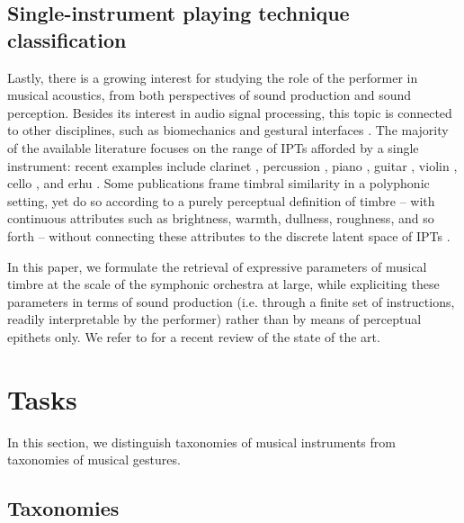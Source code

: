 \documentclass{article}
\makeatletter
\newcommand*{\ie}{i.e.\@\xspace}
\makeatother
\begin{document}
\subsection{Single-instrument playing technique classification}
Lastly, there is a growing interest for studying the role of the performer in musical acoustics, from both perspectives of sound production and sound perception.
Besides its interest in audio signal processing, this topic is connected to other disciplines, such as biomechanics and gestural interfaces \cite{metcalf2014frontiers}.
The majority of the available literature focuses on the range of IPTs afforded by a single instrument: recent examples include clarinet \cite{loureiro2004ismir}, percussion \cite{tindale2004ismir}, piano \cite{bernays2013smc}, guitar \cite{foulon2013cmmr,su2014ismir,chen2015ismir}, violin \cite{young2008nime}, cello \cite[chapter 6]{chudy2016phd}, and erhu \cite{yang2014fma}.
Some publications frame timbral similarity in a polyphonic setting, yet do so according to a purely perceptual definition of timbre -- with continuous attributes such as brightness, warmth, dullness, roughness, and so forth -- without connecting these attributes to the discrete latent space of IPTs \cite{antoine2018isma}.

In this paper, we formulate the retrieval of expressive parameters of musical timbre at the scale of the symphonic orchestra at large, while expliciting these parameters in terms of sound production (\ie{} through a finite set of instructions, readily interpretable by the performer) rather than by means of perceptual epithets only.
We refer to \cite{leman2017chapter} for a recent review of the state of the art.


\section{Tasks}
In this section, we distinguish taxonomies of musical instruments from taxonomies of musical gestures.

\subsection{Taxonomies}
\end{document}
